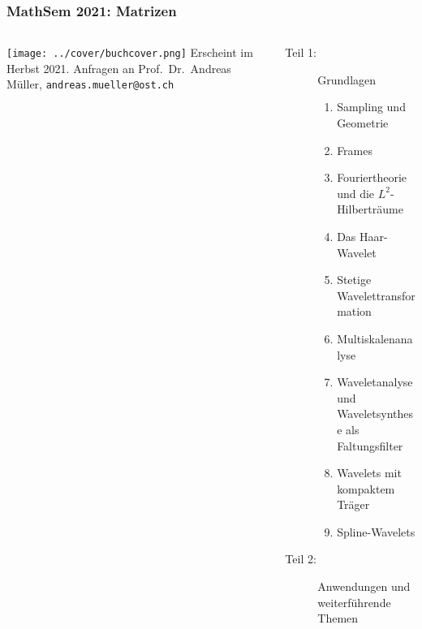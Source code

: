 \documentclass[handout]{beamer}
\title[]{}
\begin{document}
\begin{frame}
\frametitle{%
MathSem 2021: Matrizen}
\begin{columns}[onlytextwidth]
\begin{column}{0.31\textwidth}
\texttt{[image: ../cover/buchcover.png]}
\vskip 0.2cm
\bigskip
\bigskip
Erscheint im Herbst 2021.
Anfragen an
Prof.~Dr.~Andreas Müller,
{\texttt{andreas.mueller@ost.ch}}
\bigskip
\bigskip
\bigskip
\end{column}
\begin{column}{0.67\textwidth}
\begin{description}
\item[Teil 1:] Grundlagen
\begin{enumerate}
\item Sampling und Geometrie
\item Frames
\item Fouriertheorie und die $L^2$-Hilberträume
\item Das Haar-Wavelet
\item Stetige Wavelettransformation
\item Multiskalenanalyse
\item Waveletanalyse und Waveletsynthese als Faltungsfilter
\item Wavelets mit kompaktem Träger
\item Spline-Wavelets
\end{enumerate}
\item[Teil 2:] Anwendungen und weiterführende Themen
\begin{enumerate}
\setcounter{enumi}{9}
\end{enumerate}
\end{description}
\end{column}
\end{columns}
\end{frame}
\end{document}
